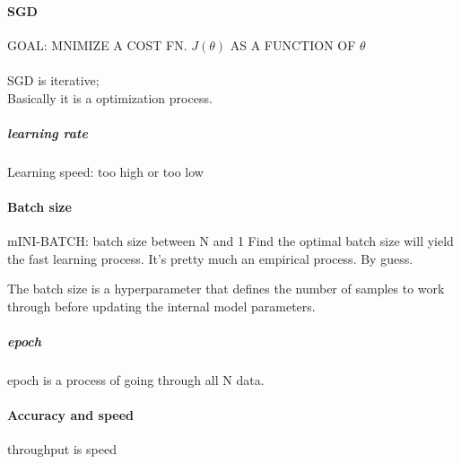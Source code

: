 \documentclass[12pt]{article}
\begin{document}
\paragraph{SGD}
GOAL: MNIMIZE A COST FN. $J(\theta)$ AS A FUNCTION OF $\theta$
\\ 
\\SGD is iterative;
\\Basically it is a optimization process.

\subparagraph{learning rate}
Learning speed: too high or too low

\paragraph{Batch size}
mINI-BATCH: batch size between N and 1
Find the optimal batch size will yield the fast learning process.
It's pretty much an empirical process. By guess.

The batch size is a hyperparameter that defines the number of samples to work through before updating the internal model parameters.

\subparagraph{epoch}
epoch is a process of going through all N data.

\paragraph{Accuracy and speed}
throughput is speed
\end{document}
